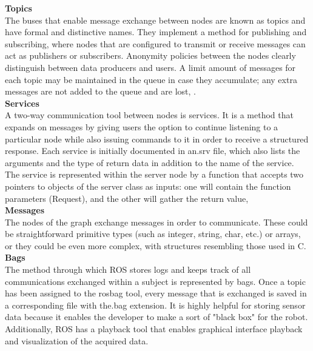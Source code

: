 \textbf{Topics}\\
 The buses that enable message exchange between nodes are known as topics and have formal and distinctive names. They implement a method for publishing and subscribing, where nodes that are configured to transmit or receive messages can act as publishers or subscribers. Anonymity policies between the nodes clearly distinguish between data producers and users. A limit amount of messages for each topic may be maintained in the queue in case they accumulate; any extra messages are not added to the queue and are lost, \citet{rostopics}.\\
\newline
\textbf{Services}\\
A two-way communication tool between nodes is services. It is a method that expands on messages by giving users the option to continue listening to a particular node while also issuing commands to it in order to receive a structured response. Each service is initially documented in an.srv file, which also lists the arguments and the type of return data in addition to the name of the service.
The service is represented within the server node by a function that accepts two pointers to objects of the server class as inputs: one will contain the function parameters (Request), and the other will gather the return value, \citet{rosservice}\\
\newline
\textbf{Messages}\\
The nodes of the graph exchange messages in order to communicate. These could be straightforward primitive types (such as integer, string, char, etc.) or arrays, or they could be even more complex, with structures resembling those used in C.\\
\newline
\textbf{Bags}\\
The method through which ROS stores logs and keeps track of all communications exchanged within a subject is represented by bags. Once a topic has been assigned to the rosbag tool, every message that is exchanged is saved in a corresponding file with the.bag extension. It is highly helpful for storing sensor data because it enables the developer to make a sort of "black box" for the robot. Additionally, ROS has a playback tool that enables graphical interface playback and visualization of the acquired data.\\

